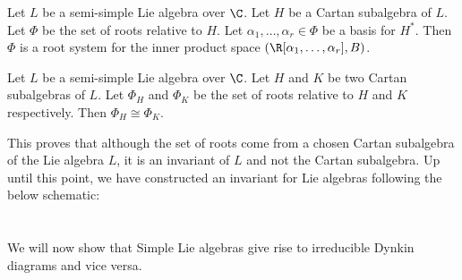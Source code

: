 \documentclass[a4paper]{article}
\begin{document}
\begin{prp}{}{} Let $L$ be a semi-simple Lie algebra over $\C$. Let $H$ be a Cartan subalgebra of $L$. Let $\Phi$ be the set of roots relative to $H$. Let $\alpha_1,\dots,\alpha_r\in\Phi$ be a basis for $H^\ast$. Then $\Phi$ is a root system for the inner product space $(\R[\alpha_1,\dots,\alpha_r],B)$. 
\end{prp}

\begin{prp}{}{} Let $L$ be a semi-simple Lie algebra over $\C$. Let $H$ and $K$ be two Cartan subalgebras of $L$. Let $\Phi_H$ and $\Phi_K$ be the set of roots relative to $H$ and $K$ respectively. Then $\Phi_H\cong\Phi_K$. 
\end{prp}

This proves that although the set of roots come from a chosen Cartan subalgebra of the Lie algebra $L$, it is an invariant of $L$ and not the Cartan subalgebra. Up until this point, we have constructed an invariant for Lie algebras following the below schematic: \\~\\
 \\

We will now show that Simple Lie algebras give rise to irreducible Dynkin diagrams and vice versa. 
\end{document}

